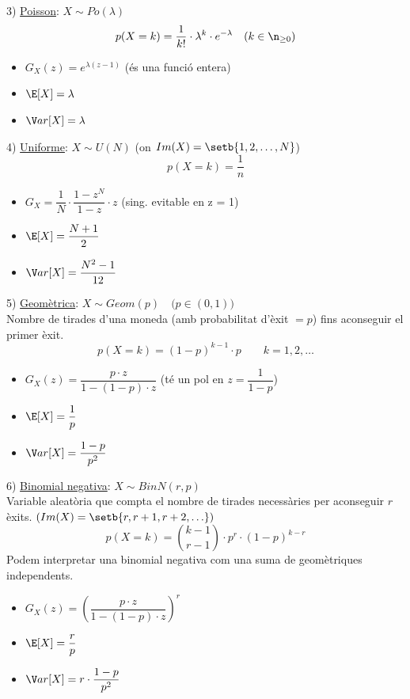 \vspace{0.5cm}

3) \underline{Poisson}: $X \sim Po(\lambda)$
\[
  p(X=k) = \frac{1}{k!}\cdot \lambda^{k}\cdot e^{-\lambda} \quad (k\in \n_{\geq 0})
\]
\begin{itemize}
    \item $G_{X}(z) = e^{\lambda(z-1)}$ \quad (és una funció entera)
    \item $\E[X] = \lambda$
    \item $\V ar[X] = \lambda$
\end{itemize}

\vspace{0.5cm}

4) \underline{Uniforme}: $X\sim U(N)$ \quad (on $Im(X) = \setb{1,2,\ldots, N}$) \\
\[
  p(X=k) = \frac{1}{n}
\]
\begin{itemize}
    \item $G_{X} = \dfrac{1}{N}\cdot \dfrac{1-z^{N}}{1-z}\cdot z$ \quad (sing. evitable en z = 1)
    \item $\E[X]=\dfrac{N+1}{2}$
    \item $\V ar[X] = \dfrac{N^{2}-1}{12}$
\end{itemize}

\newpage

5) \underline{Geomètrica}: $X\sim Geom(p) \quad \big(p\in(0,1)\big)$ \\
Nombre de tirades d'una moneda (amb probabilitat d'èxit $= p$) fins aconseguir el primer èxit.
\[
  p(X=k) = (1-p)^{k-1}\cdot p \qquad k = 1,2,\ldots
\]
\begin{itemize}
    \item $G_{X}(z) = \dfrac{p\cdot z}{1-(1-p)\cdot z}$ \quad (té un pol en $z=\dfrac{1}{1-p}$)
    \item $\E[X] = \dfrac{1}{p}$
    \item $\V ar[X] = \dfrac{1-p}{p^{2}}$
\end{itemize}

\vspace{0.5cm}

6) \underline{Binomial negativa}: $X\sim BinN(r, p)$ \\
Variable aleatòria que compta el nombre de tirades necessàries per aconseguir $r$ èxits. $\left(Im(X)=\setb{r,r+1,r+2, \ldots}\right)$
\[
  p(X=k) = \binom{k-1}{r-1}\cdot p^{r}\cdot(1-p)^{k-r}
\]
Podem interpretar una binomial negativa com una suma de geomètriques independents.
\begin{itemize}
    \item $G_{X}(z) = \left( \dfrac{p\cdot z}{1-(1-p)\cdot z} \right)^{r}$
    \item $\E[X] = \dfrac{r}{p}$
    \item $\V ar[X] = r\cdot \dfrac{1-p}{p^2}$
\end{itemize}

